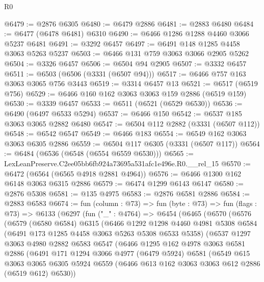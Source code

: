 \begin{lexlean}{R0}
\begin{coremodule}
@6479 := @2876 @6305
@6480 := @6479 @2886
@6481 := @2883 @6480
@6484 := @6477 (@6478 @6481) @6310
@6490 := @6466 @1286 @1288 @4460 @3066 @5237 @6481
@6491 := @3292 @6457
@6497 := @6491 @148 @1285 @4458 @3063 @5263 @5237
@6503 := @6466 @131 @759 @3063 @3066 @2905 @5262
@6504 := @3326 @6457
@6506 := @6504 @94 @2905
@6507 := @3332 @6457
@6511 := @6503 (@6506 (@3331 (@6507 @94)))
@6517 := @6466 @757 @163 @3063 @3065 @756 @3443
@6519 := @3314 @6457 @13
@6521 := @6517 (@6519 @756)
@6529 := @6466 @160 @162 @3063 @3063 @159 @2886 (@6519 @159)
@6530 := @3339 @6457
@6533 := @6511 (@6521 (@6529 @6530))
@6536 := @6490 (@6497 @6533 @5294)
@6537 := @6466 @150
@6542 := @6537 @185 @3063 @3065 @2882 @6480
@6547 := @6504 @112 @2882 (@3331 (@6507 @112))
@6548 := @6542 @6547
@6549 := @6466 @183
@6554 := @6549 @162 @3063 @3063 @6305 @2886
@6559 := @6504 @117 @6305 (@3331 (@6507 @117))
@6564 := @6484 (@6536 (@6548 (@6554 @6559 @6530)))
@6565 := LexLeanPreserve.C2ee05bb6fb924a73695a531afc1e496e.R0.__rel_15
@6570 := @6472 (@6564 (@6565 @4918 @2881 @4964))
@6576 := @6466 @1300 @162 @6148 @3063 @6315 @2886
@6579 := @6474 @1299 @6143 @6147
@6580 := @2876 @5308
@6581 := @135 @4975
@6583 := @2876 @6581 @2886
@6584 := @2883 @6583
@6674 := fun (column : @73) =>
  fun (byte : @73) =>
  fun (flags : @73) =>
  @6133
    (@6297
      (fun ("_" : @4764) =>
      @6454
        (@6465
          (@6570
            (@6576
              (@6579
                (@6580 @6584)
                @6315
                (@6466
                  @1292
                  @1298
                  @4460
                  @4981
                  @5308
                  @6584
                  (@6491 @173 @1285 @4458 @3063 @5263 @5308 @6533 @5358)
                  (@6537
                    @1297
                    @3063
                    @4980
                    @2882
                    @6583
                    @6547
                    (@6466
                      @1295
                      @162
                      @4978
                      @3063
                      @6581
                      @2886
                      (@6491
                        @171
                        @1294
                        @3066
                        @4977
                        (@6479 @5924)
                        @6581
                        (@6549
                          @615
                          @3063
                          @3065
                          @6305
                          @5924
                          @6559
                          (@6466 @613 @162 @3063 @3063 @612 @2886 (@6519 @612) @6530))

\end{coremodule}
\end{lexlean}
